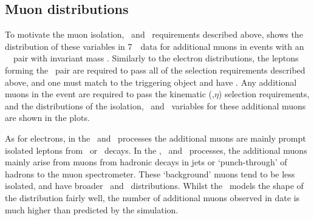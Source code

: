 
\subsection{Muon distributions}

To motivate the muon isolation, \dzerosig\ and \zzero\ requirements described
above,  shows the distribution of these variables in 7~\tev\ data for additional
muons in events with an \ossf\ \dilepton\ pair with invariant mass \sstooos.
Similarly to the electron distributions, the leptons forming the \dilepton\ pair are required to pass all of
the selection requirements described above, and one must match to the triggering
object and have . Any additional muons in the event are required to pass
the kinematic (\pt,$\eta$) selection requirements, and the distributions of the isolation, \dzerosig\ and \zzero\
variables for these additional muons are shown in the plots. 

As for electrons, in the \WZ\ and \ZZ\ processes the additional muons 
are mainly prompt isolated leptons from \W\ or \Z\ decays. In the \Zll,
\ttbar\ and \WW\ processes, the additional muons mainly arise from muons from
hadronic decays in jets or `punch-through' of hadrons to the muon spectrometer.
These `background' muons tend to be less isolated, and have broader \dzerosig\
and \zzero\ distributions. Whilst the \mc\ models the shape of the distribution
fairly well, the number of additional muons observed in date is much higher than
predicted by the simulation.

